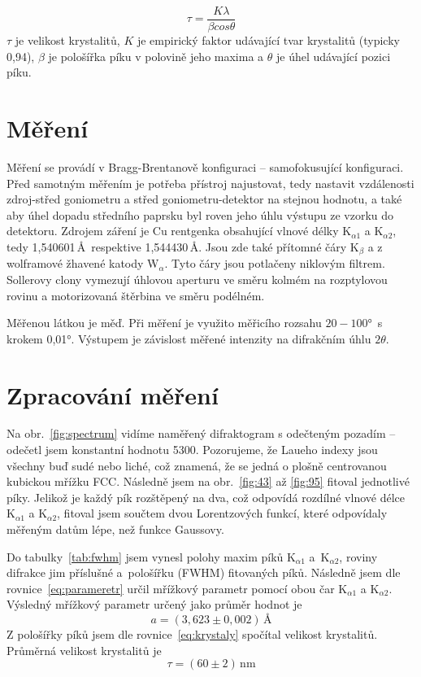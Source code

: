 \documentclass[a4paper,12pt]{article}
\begin{document}
\begin{equation}
	\tau = \dfrac{K\lambda}{\beta cos\theta}
	\label{eq:krystaly}
\end{equation}
$\tau$ je velikost krystalitů, $K$ je empirický faktor udávající tvar 
krystalitů (typicky 0,94), $\beta$ je pološířka píku v polovině jeho maxima a 
$\theta$ je úhel udávající pozici píku.

\section{Měření}\noindent
Měření se provádí v Bragg-Brentanově konfiguraci -- samofokusující 
konfiguraci. Před samotným měřením je potřeba přístroj najustovat, tedy 
nastavit 
vzdálenosti zdroj-střed goniometru a střed goniometru-detektor na stejnou 
hodnotu, a také aby úhel dopadu středního paprsku byl roven jeho úhlu výstupu 
ze vzorku do detektoru. Zdrojem záření je Cu rentgenka obsahující vlnové délky 
K$_{\alpha1}$ a K$_{\alpha2}$, tedy 1,540601\,\AA\ respektive 1,544430\,\AA. 
Jsou zde také přítomné čáry K$_{\beta}$ a z wolframové žhavené 
katody W$_\alpha$. Tyto čáry jsou potlačeny niklovým filtrem. 
Sollerovy clony vymezují úhlovou aperturu ve směru kolmém na rozptylovou rovinu 
a motorizovaná štěrbina ve směru podélném.

Měřenou látkou je měď. Při měření je využito měřicího rozsahu 
$20 - 100$°~s krokem 0,01°. Výstupem je závislost měřené intenzity na 
difrakčním úhlu $2\theta$.

\section{Zpracování měření}\noindent
Na obr.~\ref{fig:spectrum} vidíme naměřený difraktogram s odečteným 
pozadím -- odečetl jsem konstantní hodnotu 5300. Pozorujeme, že Laueho indexy 
jsou všechny buď sudé nebo liché, což znamená, že se jedná o plošně centrovanou 
kubickou mřížku FCC. Následně jsem na obr.~\ref{fig:43} až \ref{fig:95} fitoval 
jednotlivé 
píky. Jelikož je každý pík rozštěpený na dva, což odpovídá rozdílné vlnové 
délce K$_{\alpha1}$ a K$_{\alpha2}$, fitoval jsem součtem dvou Lorentzových 
funkcí, které odpovídaly měřeným datům lépe, než funkce Gaussovy.

Do tabulky~\ref{tab:fwhm} jsem vynesl polohy maxim píků K$_{\alpha1}$ 
a~K$_{\alpha2}$, roviny difrakce jim příslušné a~pološířku (FWHM) fitovaných 
píků.
Následně jsem dle rovnice~\eqref{eq:parameretr} určil mřížkový parametr pomocí 
obou čar K$_{\alpha1}$ a K$_{\alpha2}$. Výsledný mřížkový parametr určený jako 
průměr hodnot je $$a = (3,623\pm0,002)\,\si{\angstrom}$$
Z pološířky píků jsem 
dle rovnice~\eqref{eq:krystaly} spočítal velikost krystalitů. Průměrná velikost 
krystalitů je $$\tau = (60 \pm 2)\,\si{\nano\meter}$$ 
\end{document}

